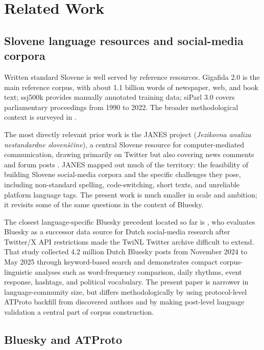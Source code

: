 \section{Related Work}

\subsection{Slovene language resources and social-media corpora}

Written standard Slovene is well served by reference resources. Gigafida 2.0 \parencite{krek2020b-gf,gigafida-clarin} is the main reference corpus, with about 1.1 billion words of newspaper, web, and book text; ssj500k \parencite{krek2020a-ssj500k} provides manually annotated training data; siParl 3.0 \parencite{parliamentaryCorpus} covers parliamentary proceedings from 1990 to 2022. The broader methodological context is surveyed in \textcite{studije2005korpusnem}.

The most directly relevant prior work is the JANES project (\textit{Jezikovna analiza nestandardne slovenščine}), a central Slovene resource for computer-mediated communication, drawing primarily on Twitter but also covering news comments and forum posts \parencite{erjavec2019janes}. JANES mapped out much of the territory: the feasibility of building Slovene social-media corpora and the specific challenges they pose, including non-standard spelling, code-switching, short texts, and unreliable platform language tags. The present work is much smaller in scale and ambition; it revisits some of the same questions in the context of Bluesky.

The closest language-specific Bluesky precedent located so far is \textcite{tjongKimSang2025bluesky}, who evaluates Bluesky as a successor data source for Dutch social-media research after Twitter/X API restrictions made the TwiNL Twitter archive difficult to extend. That study collected 4.2 million Dutch Bluesky posts from November 2024 to May 2025 through keyword-based search and demonstrates compact corpus-linguistic analyses such as word-frequency comparison, daily rhythms, event response, hashtags, and political vocabulary. The present paper is narrower in language-community size, but differs methodologically by using protocol-level ATProto backfill from discovered authors and by making post-level language validation a central part of corpus construction.

\subsection{Bluesky and ATProto}

